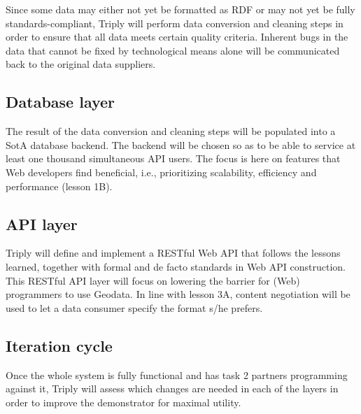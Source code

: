 \documentclass[a4paper]{scrartcl}
\begin{document}
Since some data may either not yet be formatted as RDF or may not yet
be fully standards-compliant, Triply will perform data conversion and
cleaning steps in order to ensure that all data meets certain quality
criteria.  Inherent bugs in the data that cannot be fixed by
technological means alone will be communicated back to the original
data suppliers.

\subsection{Database layer}

The result of the data conversion and cleaning steps will be populated
into a SotA database backend.  The backend will be chosen so as to be
able to service at least one thousand simultaneous API users.  The
focus is here on features that Web developers find beneficial, i.e.,
prioritizing scalability, efficiency and performance (lesson 1B).

\subsection{API layer}

Triply will define and implement a RESTful Web API that follows the
lessons learned, together with formal and de facto standards in Web
API construction.  This RESTful API layer will focus on lowering the
barrier for (Web) programmers to use Geodata.  In line with lesson 3A,
content negotiation will be used to let a data consumer specify the
format s/he prefers.



\subsection{Iteration cycle}

Once the whole system is fully functional and has task 2 partners
programming against it, Triply will assess which changes are needed in
each of the layers in order to improve the demonstrator for maximal
utility.
\end{document}
